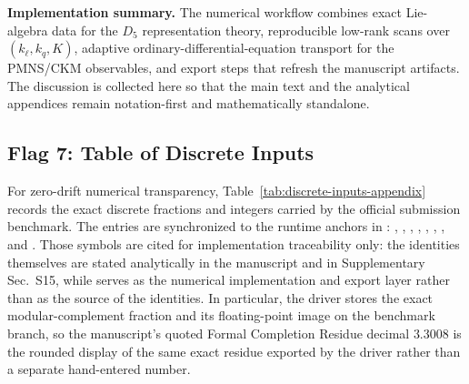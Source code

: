 \documentclass[11pt]{article}
\begin{document}
\noindent\textbf{Implementation summary.} The numerical workflow combines exact Lie-algebra data for the $D_5$ representation theory, reproducible low-rank scans over $(k_{\ell},k_q,K)$, adaptive ordinary-differential-equation transport for the PMNS/CKM observables, and export steps that refresh the manuscript artifacts. The discussion is collected here so that the main text and the analytical appendices remain notation-first and mathematically standalone.

\subsection*{Flag 7: Table of Discrete Inputs}

For zero-drift numerical transparency, Table~\ref{tab:discrete-inputs-appendix} records the exact discrete fractions and integers carried by the official  submission benchmark. The entries are synchronized to the runtime anchors in : , , , , , , , and . Those symbols are cited for implementation traceability only: the identities themselves are stated analytically in the manuscript and in Supplementary Sec.~S15, while  serves as the numerical implementation and export layer rather than as the source of the identities. In particular, the driver stores the exact modular-complement fraction and its floating-point image on the benchmark branch, so the manuscript's quoted Formal Completion Residue decimal $3.3008$ is the rounded display of the same exact residue exported by the driver rather than a separate hand-entered number.
\end{document}
